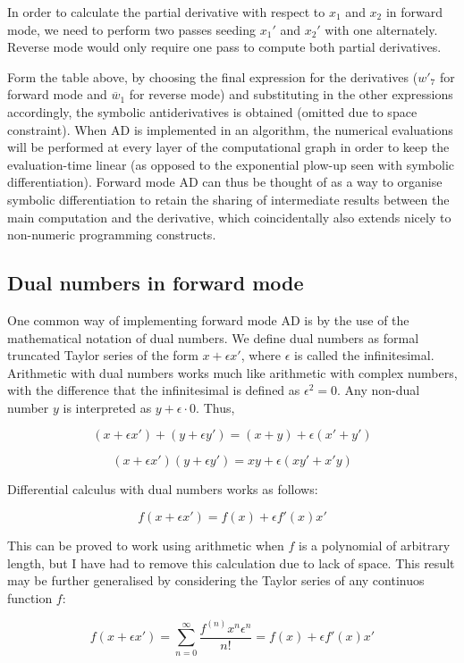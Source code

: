 \documentclass[11pt]{article}
\begin{document}
In order to calculate the partial derivative with respect to $ x_1 $ and $ x_2 $ in forward mode, we need to perform two passes seeding $ {x_1}' $ and $ {x_2}' $ with one alternately. Reverse mode would only require one pass to compute both partial derivatives. 

Form the table above, by choosing the final expression for the derivatives ($ w'_7 $ for forward mode and $ \overline w _1 $ for reverse mode) and substituting in the other expressions accordingly, the symbolic antiderivatives is obtained (omitted due to space constraint). When AD is implemented in an algorithm, the numerical evaluations will be performed at every layer of the computational graph in order to keep the evaluation-time linear (as opposed to the exponential plow-up seen with symbolic differentiation). Forward mode AD can thus be thought of as a way to organise symbolic differentiation to retain the sharing of intermediate results between the main computation and the derivative, which coincidentally also extends nicely to non-numeric programming constructs.

\subsection{Dual numbers in forward mode}

One common way of implementing forward mode AD is by the use of the mathematical notation of dual numbers. We define dual numbers as formal truncated Taylor series of the form $ x+\epsilon x' $, where $ \epsilon $ is called the infinitesimal. Arithmetic with dual numbers works much like arithmetic with complex numbers, with the difference that the infinitesimal is defined as $ \epsilon ^2 = 0 $. Any non-dual number $ y $ is interpreted as $ y+\epsilon \cdot 0 $. Thus, 

\[ (x + \epsilon x')+(y + \epsilon y') = (x+y) + \epsilon(x'+y')\]

\[ (x+\epsilon x')(y+\epsilon y')=xy+\epsilon (xy'+x'y) \]

Differential calculus with dual numbers works as follows:

\[ f(x + \epsilon x') = f(x)+\epsilon f'(x)x'  \] 

This can be proved to work using arithmetic when $ f $ is a polynomial of arbitrary length, but I have had to remove this calculation due to lack of space. This result may be further generalised by considering the Taylor series of any continuos function $ f $:

\[ f(x+\epsilon x')=  \sum \limits _{n=0}^{\infty} \frac{f^{(n)}x^n\epsilon ^n}{n!} = f(x) + \epsilon f'(x)x'\]
\end{document}
